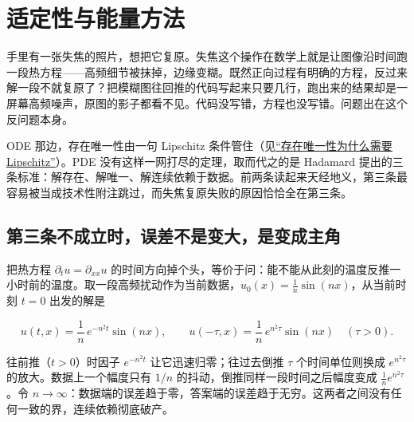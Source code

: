 \section{适定性与能量方法}
\label{sec:15-Differential-Equations-and-Dynamical-Systems/03-PDE-Introduction/03}

手里有一张失焦的照片，想把它复原。失焦这个操作在数学上就是让图像沿时间跑一段热方程——高频细节被抹掉，边缘变糊。既然正向过程有明确的方程，反过来解一段不就复原了？把模糊图往回推的代码写起来只要几行，跑出来的结果却是一屏幕高频噪声，原图的影子都看不见。代码没写错，方程也没写错。问题出在这个反问题本身。

ODE 那边，存在唯一性由一句 Lipschitz 条件管住（见\hyperref[sec:15-Differential-Equations-and-Dynamical-Systems/01-ODE-Theory/03]{``存在唯一性为什么需要 Lipschitz''}）。PDE 没有这样一网打尽的定理，取而代之的是 Hadamard 提出的三条标准：解存在、解唯一、解连续依赖于数据。前两条读起来天经地义，第三条最容易被当成技术性附注跳过，而失焦复原失败的原因恰恰全在第三条。

\subsection{第三条不成立时，误差不是变大，是变成主角}

把热方程 \(\partial_tu=\partial_{xx}u\) 的时间方向掉个头，等价于问：能不能从此刻的温度反推一小时前的温度。取一段高频扰动作为当前数据，\(u_0(x)=\frac1n\sin(nx)\)，从当前时刻 \(t=0\) 出发的解是

\[
u(t,x)=\frac1n\,e^{-n^2t}\sin(nx),
\qquad
u(-\tau,x)=\frac1n\,e^{n^2\tau}\sin(nx)\quad(\tau>0).
\]

往前推（\(t>0\)）时因子 \(e^{-n^2t}\) 让它迅速归零；往过去倒推 \(\tau\) 个时间单位则换成 \(e^{n^2\tau}\) 的放大。数据上一个幅度只有 \(1/n\) 的抖动，倒推同样一段时间之后幅度变成 \(\frac1n e^{n^2\tau}\)。令 \(n\to\infty\)：数据端的误差趋于零，答案端的误差趋于无穷。这两者之间没有任何一致的界，连续依赖彻底破产。

\begin{center}
\end{center}

